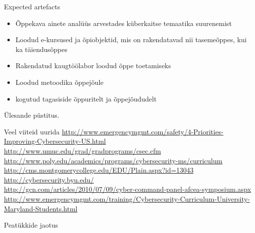 Expected artefacts
\begin{itemize}
	\item Õppekava ainete analüüs arvestades küberkaitse temaatika suurenemist
	\item Loodud e-kursused ja õpiobjektid, mis on rakendatavad nii tasemeõppes, kui ka täiendusõppes
	\item Rakendatud kaugtöölabor loodud õppe toetamiseks
	\item Loodud metoodika õppejõule
	\item kogutud tagasiside õppuritelt ja õppejõududelt
\end{itemize}

Ülesande püstitus.

Veel viiteid uurida 
\url{http://www.emergencymgmt.com/safety/4-Priorities-Improving-Cybersecurity-US.html}\\
\url{http://www.umuc.edu/grad/gradprograms/csec.cfm}
\\
\url{http://www.poly.edu/academics/programs/cybersecurity-ms/curriculum}\\
\url{http://cms.montgomerycollege.edu/EDU/Plain.aspx?id=13043}\\
\url{http://cybersecurity.byu.edu/}\\
\url{http://gcn.com/articles/2010/07/09/cyber-command-panel-afcea-symposium.aspx}\\
\url{http://www.emergencymgmt.com/training/Cybersecurity-Curriculum-University-Maryland-Students.html}\\

\par Peatükkide jaotus